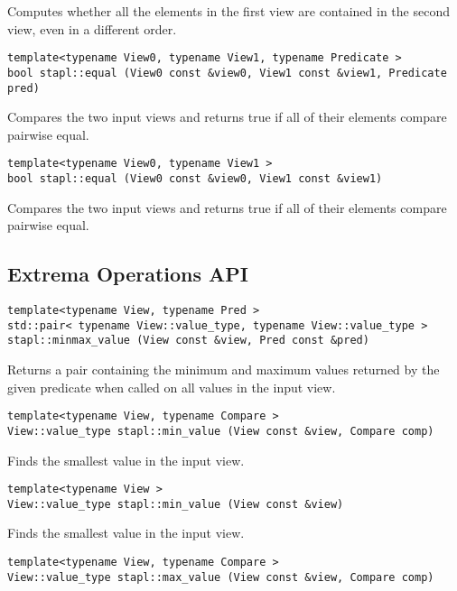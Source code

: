 Computes whether all the elements in the first view are contained in the second view, even in a different order.

\begin{verbatim}
template<typename View0, typename View1, typename Predicate >
bool stapl::equal (View0 const &view0, View1 const &view1, Predicate pred)
\end{verbatim}

Compares the two input views and returns true if all of their elements compare pairwise equal.

\begin{verbatim}
template<typename View0, typename View1 >
bool stapl::equal (View0 const &view0, View1 const &view1)
\end{verbatim}

Compares the two input views and returns true if all of their elements compare pairwise equal.


\subsection{Extrema Operations API} \label{sec-extrem-alg}

\begin{verbatim}
template<typename View, typename Pred >
std::pair< typename View::value_type, typename View::value_type >
stapl::minmax_value (View const &view, Pred const &pred)
\end{verbatim}

Returns a pair containing the minimum and maximum values returned by the given predicate when called on all values in the input view.

\begin{verbatim}
template<typename View, typename Compare >
View::value_type stapl::min_value (View const &view, Compare comp)
\end{verbatim}

Finds the smallest value in the input view.

\begin{verbatim}
template<typename View >
View::value_type stapl::min_value (View const &view)
\end{verbatim}

Finds the smallest value in the input view.

\begin{verbatim}
template<typename View, typename Compare >
View::value_type stapl::max_value (View const &view, Compare comp)
\end{verbatim}

